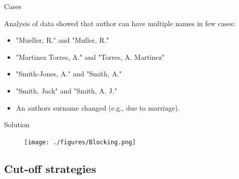 \documentclass{beamer}
\begin{document}


\begin{frame} {Cases}

Analysis of data showed that author can have multiple names in few cases:

\begin {itemize}
 \item "Mueller, R." and "Muller, R."

  \item "Martinez Torres, A." and "Torres, A. Martinez"

  \item "Smith-Jones, A." and "Smith, A."

  \item "Smith, Jack" and "Smith, A. J."

  \item An authors surname changed (e.g., due to marriage).

\end {itemize}


\end{frame}



\begin{frame} {Solution}


\begin{figure}
   \centering
   \texttt{[image: ./figures/Blocking.png]}
\end{figure}



\end{frame}




\subsection{Cut-off strategies}
\end{document}
